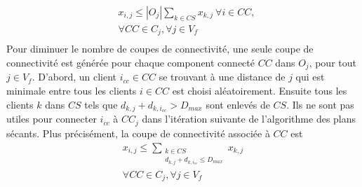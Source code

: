 \documentclass[12pt,a4paper]{article}
\begin{document}
\begin{multicols}{2}
\begin{align*}
&x_{i,j} \leq |O_{j}|\sum_{k \in CS}{x_{k,j}} \ \forall i \in CC, \\ 
&\forall CC \in C_{j}, \forall j \in V_{f}\\ 
\end{align*}
Pour diminuer le nombre de coupes de connectivité, une seule coupe de connectivité est générée pour chaque component connecté $CC$ dans $O_{j}$, pour tout $j \in V_{f}$. D'abord, un client $i_{cc} \in CC$ se trouvant à une distance de $j$ qui est minimale entre tous les clients $i \in CC$ est choisi aléatoirement. Ensuite tous les clients $k$ dans $CS$ tels que $d_{k,j}+d_{k,i_{cc}}>D_{max}$ sont enlevés de $CS$. Ils ne sont pas utiles pour connecter $i_{cc}$ à $CC_{j}$ dans l'itération suivante de l'algorithme des plans sécants. Plus précisément, la coupe de connectivité associée à $CC$ est
\begin{equation}
\begin{aligned}
x_{i,j} \leq  \sum_{\substack{k \in CS \\d_{k,j}+d_{k,i_{cc}}\leq D_{max}}}{x_{k,j}} \\  
\forall CC \in C_{j}, \forall j \in V_{f}\\ 
\end{aligned}
\end{equation}

\end{multicols}
\end{document}
